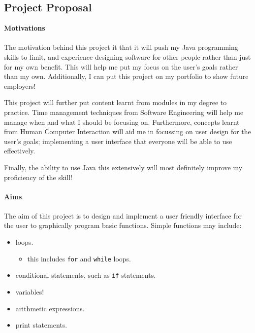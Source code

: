 \documentclass[a4paper, 12pt]{article}
\begin{document}
        \clearpage
        \subsection{Project Proposal}
            \textbf{Motivations} \\\\    
            The motivation behind this project it that it will push my Java programming
            skills to limit, and experience designing software for other people rather
            than just for my own benefit. This will help me put my focus on the user's
            goals rather than my own. Additionally, I can put this project on my portfolio
            to show future employers!

            This project will further put content learnt from modules in my degree to                practice. Time management techniques from Software Engineering will help me
            manage when and what I should be focusing on. Furthermore, concepts learnt
            from Human Computer Interaction will aid me in focussing on user design for
            the user's goals; implementing a user interface that everyone will be able to
            use effectively.
        
            Finally, the ability to use Java this extensively will most definitely improve
            my proficiency of the skill! \\\\
            \textbf{Aims} \\\\
            The aim of this project is to design and implement a user friendly interface for
            the user to graphically program basic functions. Simple functions may include:
            \begin{itemize}
                \item loops.
                \begin{itemize}
                    \item this includes \texttt{for} and \texttt{while} loops.
                \end{itemize}
                \item conditional statements, such as \texttt{if} statements.
                \item variables!
                \item arithmetic expressions.
                \item print statements.
            \end{itemize}
            
\end{document}
